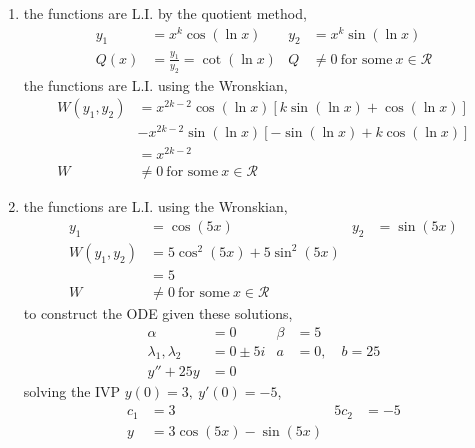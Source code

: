 \begin{enumerate}
    \item the functions are L.I. by the quotient method,
          \begin{align}
              y_{1} & = x^{k}\cos(\ln x)                         &
              y_{2} & = x^{k}\sin(\ln x)                           \\
              Q(x)  & = \frac{y_{1}}{y_{2}} = \cot(\ln x)        &
              Q     & \neq 0\ \text{for some}\ x \in \mathcal{R}
          \end{align}
          the functions are L.I. using the Wronskian,
          \begin{align}
              W(y_{1}, y_{2}) & = x^{2k-2}\cos(\ln x)[ k\sin(\ln x) + \cos(\ln x)] \\
                              & - x^{2k-2}\sin(\ln x)[-\sin(\ln x) + k\cos(\ln x)] \\
                              & = x^{2k-2}                                         \\
              W               & \neq 0\ \text{for some}\ x \in \mathcal{R}
          \end{align}

    \item the functions are L.I. using the Wronskian,
          \begin{align}
              y_{1}           & = \cos(5x)                                 &
              y_{2}           & = \sin(5x)                                   \\
              W(y_{1}, y_{2}) & = 5\cos^{2}(5x) + 5\sin^{2}(5x)              \\
                              & = 5                                          \\
              W               & \neq 0\ \text{for some}\ x \in \mathcal{R}
          \end{align}
          to construct the ODE given these solutions,
          \begin{align}
              \alpha                   & = 0        & \beta & = 5               \\
              \lambda_{1}, \lambda_{2} & = 0 \pm 5i & a     & = 0, \quad b = 25 \\
              y'' + 25y                & = 0
          \end{align}
          solving the IVP $ y(0) = 3,\ y'(0) = -5 $,
          \begin{align}
              c_{1} & = 3                    & 5c_{2} & = -5 \\
              y     & = 3\cos(5x) - \sin(5x)
          \end{align}


\end{enumerate}

